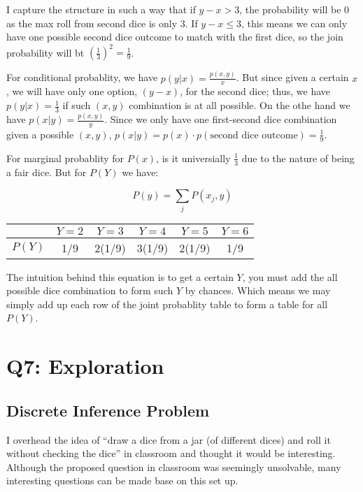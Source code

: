 \documentclass[11pt]{article}
\begin{document}
I capture the structure in such a way that if $y - x > 3$, the probability will be $0$ as the max roll from second dice is only $3$. If $y - x \leq 3$, this means we can only have one possible second dice outcome to match with the first dice, so the join probability will bt $(\frac{1}{3})^2 = \frac{1}{9}$.

For conditional probablity, we have $p(y | x) = \frac{p(x, y)}{x}$. But since given a certain $x$, we will have only one option, $(y - x)$, for the second dice; thus, we have $p(y | x) = \frac{1}{3}$ if such $(x, y)$ combination is at all possible. On the othe hand we have $p(x | y) = \frac{p(x, y)}{y}$. Since we only have one first-second dice combination given a possible $(x, y)$, $p(x | y) = p(x) \cdot p(\text{second dice outcome}) = \frac{1}{9}$.

For marginal probablity for $P(x)$, is it universially $\frac{1}{3}$ due to the nature of being a fair dice. But for $P(Y)$ we have:

\begin{equation*}
    P(y) = \sum_{j} P(x_j, y)
\end{equation*}

\begin{table}[H]
    \centering
    \begin{tabular}{ c | c | c | c | c | c}
        \hline
         & $Y = 2$ & $Y = 3$ & $Y = 4$ & $Y = 5$ & $Y = 6$ \\
        \hline
        $P(Y)$ & 1/9 & 2(1/9) & 3(1/9) & 2(1/9) & 1/9
    \end{tabular}
\end{table}

The intuition behind this equation is to get a certain $Y$, you must add the all possible dice combination to form such $Y$ by chances. Which means we may simply add up each row of the joint probablity table to form a table for all $P(Y)$.


\section*{Q7: Exploration}

\subsection*{Discrete Inference Problem}

I overhead the idea of ``draw a dice from a jar (of different dices) and roll it without checking the dice'' in classroom and thought it would be interesting. Although the proposed question in classroom was seemingly unsolvable, many interesting questions can be made base on this set up.\newline
\end{document}
